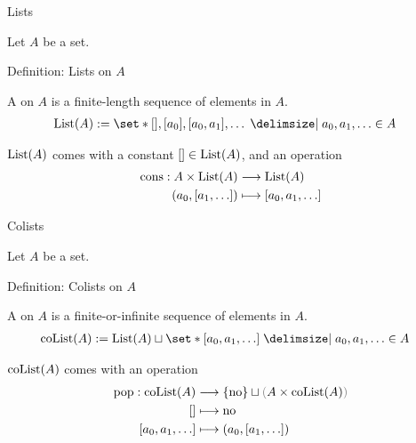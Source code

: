 
\begin{frame}[t]{Lists} %
  
  \par Let $A$ be a set.

  \begin{block}{Definition: Lists on $A$}

    \par A  on $A$ is a finite-length sequence of elements in $A$.
    \pause
    \begin{align*}
      \List (A)
      &:= \set*{
        [], [a_0], [a_0, a_1], \ldots
        \given a_0, a_1, \ldots \in A
      }
    \end{align*}
    \pause
    \par $\operatorname{List}(A)$ comes with a constant $[] \in \operatorname{List}(A)$, and an operation
    \begin{align*}
      \operatorname{cons} : A \times \operatorname{List}(A)
      &\longrightarrow \operatorname{List}(A)
      \\
      (a_0, [a_1, \ldots])
      &\longmapsto [a_0, a_1, \ldots]
    \end{align*}

  \end{block}

\end{frame}

\begin{frame}[t]{Colists} %
  
  \par Let $A$ be a set.

  \begin{block}{Definition: Colists on $A$}

    \par A  on $A$ is a finite-or-infinite sequence of elements in $A$.
    \pause
    \begin{align*}
      \coList (A)
      &:= \List(A)
      \squ \set*{
        [a_0, a_1, \ldots]
        \given a_0, a_1, \ldots \in A
      }
    \end{align*}
    \pause
    \vspace{-\baselineskip}
    \par $\operatorname{coList}(A)$ comes with an operation
    \begin{align*}
      \pop : \coList(A)
      &\longrightarrow \No \squ \textcolor{gray}{(} A \x \coList(A) \textcolor{gray}{)}
      \\
      []
      &\longmapsto \no
      \\
      [a_0, a_1, \ldots]
      &\longmapsto (a_0, [a_1, \ldots])
    \end{align*}

  \end{block}

\end{frame}

